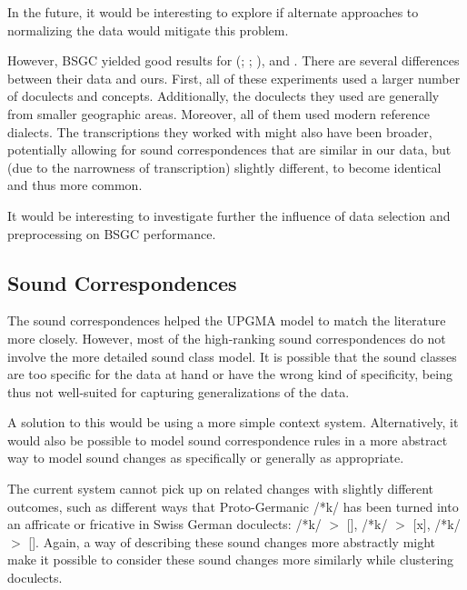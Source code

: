 \documentclass[a4paper]{article}
\begin{document}
In the future, it would be interesting to
explore if alternate approaches to normalizing the data
would mitigate this problem.

However, BSGC yielded good results for \citeauthor{wieling2011bipartite}
(\citeyear{wieling2009bipartite}; \citeyear{wieling2010hierarchical}; \citeyear{wieling2011bipartite}),
\citet{wieling2013analyzing} and \citet{montemagni2013synchronic}.
There are several differences between their data and ours.
First, all of these experiments used a larger number
of doculects and concepts.
Additionally, the doculects they used are
generally from smaller geographic areas.
Moreover, all of them used modern reference dialects.
The transcriptions they worked with might also have been broader,
potentially allowing for sound correspondences that are similar in our data,
but (due to the narrowness of transcription) slightly different,
to become identical and thus more common.

It would be interesting to investigate further the influence of
data selection and preprocessing on BSGC performance.

\subsection{Sound Correspondences}

The sound correspondences helped the UPGMA model
to match the literature more closely.
However, most of the high-ranking sound correspondences
do not involve the more detailed sound class model.
It is possible that the sound classes are too specific
for the data at hand or have the wrong kind of specificity,
being thus not well-suited for capturing generalizations of the data.

A solution to this would be using a more simple context system.
Alternatively, it would also be possible to model sound correspondence
rules in a more abstract way to model sound changes
as specifically or generally as appropriate.


The current system cannot pick up on related changes
with slightly different outcomes, such as different
ways that Proto-Germanic /*k/ has been turned into
an affricate or fricative in Swiss German doculects:
/*k/ $>$ [], /*k/ $>$ [x], /*k/ $>$ [\textchi].
Again, a way of describing these sound changes more abstractly
might make it possible to consider these sound changes more
similarly while clustering doculects.
\end{document}
